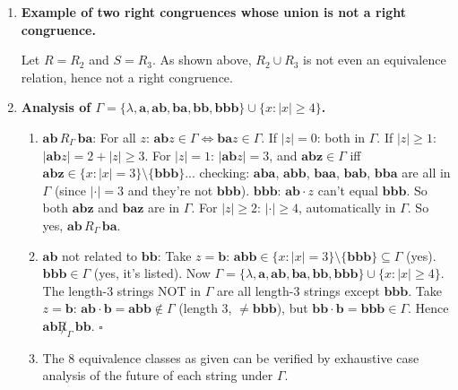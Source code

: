 \begin{enumerate}[{2.}1.]
\begin{enumerate}
\item If $R\cup S$ is an equivalence relation: for any $x,y$ with $x\,R\cup S\,y$, we have $x\,R\,y$ or $x\,S\,y$. Either way, for any $z$: $xz\,R\,yz$ or $xz\,S\,yz$ (by right congruence of $R$ or $S$), hence $xz\,R\cup S\,yz$.
\end{enumerate}

\item \textbf{Example of two right congruences whose union is not a right congruence.}

Let $R=R_2$ and $S=R_3$. As shown above, $R_2\cup R_3$ is not even an equivalence relation, hence not a right congruence.

\item \textbf{Analysis of $\Gamma=\{\lambda,\mathbf{a},\mathbf{ab},\mathbf{ba},\mathbf{bb},\mathbf{bbb}\}\cup\{x:|x|\geq 4\}$.}

\begin{enumerate}
\item $\mathbf{ab}\,R_\Gamma\,\mathbf{ba}$: For all $z$: $\mathbf{ab}z\in\Gamma\Leftrightarrow\mathbf{ba}z\in\Gamma$. If $|z|=0$: both in $\Gamma$. If $|z|\geq 1$: $|\mathbf{ab}z|=2+|z|\geq 3$. For $|z|=1$: $|\mathbf{ab}z|=3$, and $\mathbf{abz}\in\Gamma$ iff $\mathbf{abz}\in\{x:|x|=3\}\setminus\{\mathbf{bbb}\}$... checking: $\mathbf{aba}$, $\mathbf{abb}$, $\mathbf{baa}$, $\mathbf{bab}$, $\mathbf{bba}$ are all in $\Gamma$ (since $|\cdot|=3$ and they're not $\mathbf{bbb}$). $\mathbf{bbb}$: $\mathbf{ab}\cdot z$ can't equal $\mathbf{bbb}$. So both $\mathbf{abz}$ and $\mathbf{baz}$ are in $\Gamma$. For $|z|\geq 2$: $|\cdot|\geq 4$, automatically in $\Gamma$. So yes, $\mathbf{ab}\,R_\Gamma\,\mathbf{ba}$.

\item $\mathbf{ab}$ not related to $\mathbf{bb}$: Take $z=\mathbf{b}$: $\mathbf{abb}\in\{x:|x|=3\}\setminus\{\mathbf{bbb}\}\subseteq\Gamma$ (yes). $\mathbf{bbb}\in\Gamma$ (yes, it's listed). Now $\Gamma=\{\lambda,\mathbf{a},\mathbf{ab},\mathbf{ba},\mathbf{bb},\mathbf{bbb}\}\cup\{x:|x|\geq 4\}$. The length-3 strings NOT in $\Gamma$ are all length-3 strings except $\mathbf{bbb}$. Take $z=\mathbf{b}$: $\mathbf{ab}\cdot\mathbf{b}=\mathbf{abb}\notin\Gamma$ (length 3, $\neq\mathbf{bbb}$), but $\mathbf{bb}\cdot\mathbf{b}=\mathbf{bbb}\in\Gamma$. Hence $\mathbf{ab}\not R_\Gamma\,\mathbf{bb}$. $\square$

\item The 8 equivalence classes as given can be verified by exhaustive case analysis of the future of each string under $\Gamma$.


\end{enumerate}
\end{enumerate}
